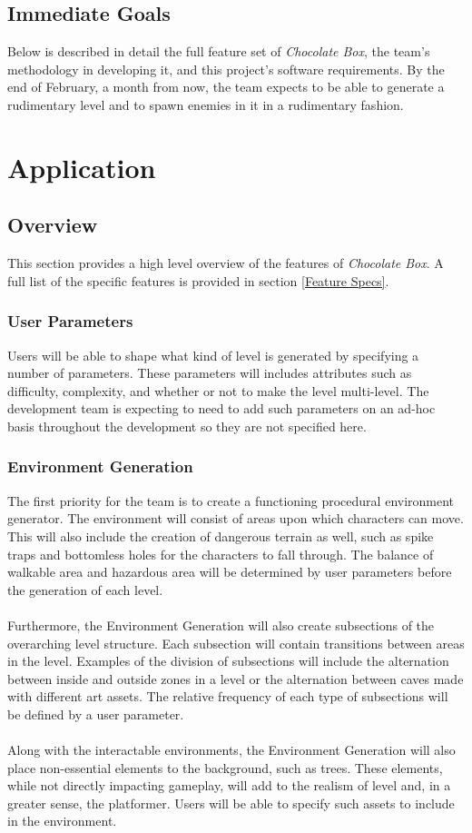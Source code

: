\documentclass[pdftex,12pt,letter]{article}
\begin{document}
\subsection{Immediate Goals}
Below is described in detail the full feature set of \textit{Chocolate Box}, the team's methodology in developing it, and this project's software requirements. By the end of February, a month from now, the team expects to be able to generate a rudimentary level and to spawn enemies in it in a rudimentary fashion.

\section{Application}
\subsection{Overview}
This section provides a high level overview of the features of \textit{Chocolate Box}. A full list of the specific features is provided in section \ref{Feature Specs}.
\subsubsection{User Parameters}
Users will be able to shape what kind of level is generated by specifying a number of parameters. These parameters will includes attributes such as difficulty, complexity, and whether or not to make the level multi-level. The development team is expecting to need to add such parameters on an ad-hoc basis throughout the development so they are not specified here.

\subsubsection{Environment Generation}
The first priority for the team is to create a functioning procedural environment generator. The environment will consist of  areas upon which characters can move. This will also include the creation of dangerous terrain as well, such as spike traps and bottomless holes for the characters to fall through. The balance of walkable area and hazardous area will be determined by user parameters before the generation of each level. 
\\\\
Furthermore, the Environment Generation will also create subsections of the overarching level structure. Each subsection will contain transitions between areas in the level. Examples of the division of subsections will include the alternation between inside and outside zones in a level or the alternation between caves made with different art assets. The relative frequency of each type of subsections will be defined by a user parameter.
\\\\
Along with the interactable environments, the Environment Generation will also place non-essential elements to the background, such as trees. These elements, while not directly impacting gameplay, will add to the realism of level and, in a greater sense, the platformer. Users will be able to specify such assets to include in the environment. 
\\
\end{document}
